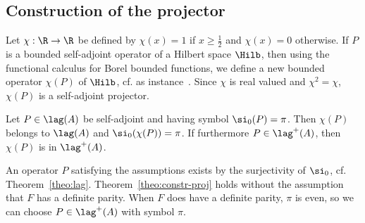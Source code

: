 \subsection{Construction of the projector}\label{sec:constr-proj}
Let $\chi : \R \rightarrow \R$ be defined by $\chi (x) =1$ if $x \geqslant
\frac{1}{2}$ and $\chi (x) =0$ otherwise. If $P$ is a bounded self-adjoint operator of a Hilbert space $\Hilb$, then using the functional calculus for Borel bounded functions, we define a new bounded operator $\chi (P)$ of $\Hilb$, cf. as instance~\cite[Theorem~VII.2]{ReSi}. Since $\chi$ is real valued and $\chi^2 = \chi$, $\chi (P)$ is a self-adjoint projector.

\begin{theo}\label{theo:constr-proj}
Let $P \in \lag (A)$ be self-adjoint and having symbol $\si_0 (P) = \pi$. Then $\chi(P)$ belongs to $\lag (A)$ and $\si_0(\chi (P)) = \pi$. If furthermore $P \in \lag ^+ (A)$, then $\chi (P)$ is in $\lag ^+ (A)$.
\end{theo}

 An operator $P$ satisfying the assumptions exists by the surjectivity of $\si_0$, cf. Theorem~\ref{theo:lag}.  Theorem~\ref{theo:constr-proj} holds without the assumption that $F$ has a definite parity. When $F$ does have a definite parity, $\pi$ is even, so we can choose $P \in \lag^{+}(A)$ with symbol $\pi$.

